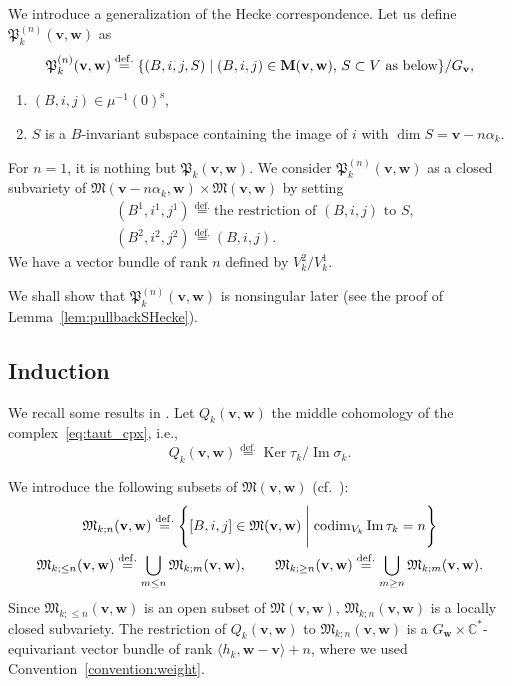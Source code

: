 \documentclass[12pt]{amsart}
\def\Bbb{\mathbb}
\def\frak{\mathfrak}
\renewcommand{\labelenumi}{(\theenumi)}%
\newenvironment{aenume}{%
  \begin{enumerate}%
  \renewcommand{\theenumi}{\alph{enumi}}%
  \renewcommand{\labelenumi}{(\theenumi)}%
  }{\end{enumerate}}
\theoremstyle{definition}
\theoremstyle{remark}
\numberwithin{equation}{subsection}
\newcommand{\lemref}[1]{Lemma~\ref{#1}}
\newcommand{\defeq}{\overset{\operatorname{\scriptstyle def.}}{=}}
\newcommand{\C}{{\Bbb C}}
\newcommand{\Ker}{\operatorname{Ker}}
\newcommand{\Ima}{\operatorname{Im}}
\newcommand{\vin}{\operatorname{in}} %
\newcommand{\vout}{\operatorname{out}} %
\newcommand{\bM}{{\mathbf M}} %
\newcommand{\M}{{\frak M}} %
\newcommand{\bv}{{\mathbf v}} %
\newcommand{\bw}{{\mathbf w}} %
\newcommand{\codim}{\operatorname{codim}} %
\newcommand{\Pa}{{\frak P}} %
\begin{document}
\subsection{}
We introduce a generalization of the Hecke correspondence.
Let us define $\Pa_k^{(n)}(\bv,\bw)$ as
\begin{equation}
\label{eq:Pa^{(n)}}
   \Pa_k^{(n)}(\bv,\bw) \defeq
   \{ (B,i,j,S)\mid
   \text{$(B,i,j)\in\bM(\bv,\bw)$, $S\subset V$ as below}\}
   /G_\bv,
\end{equation}
\begin{aenume}
\item $(B, i, j)\in\mu^{-1}(0)^{\operatorname{s}}$,
\item $S$ is a $B$-invariant subspace containing the image of $i$ with
         $\dim S = \bv - n\alpha_k$.
\end{aenume}
For $n = 1$, it is nothing but $\Pa_k(\bv,\bw)$. We consider
$\Pa_k^{(n)}(\bv,\bw)$ as a closed subvariety of
$\M(\bv-n\alpha_k,\bw)\times\M(\bv,\bw)$ by setting
\begin{align*}
  & (B^1,i^1,j^1) \defeq \text{the restriction
                               of $(B,i,j)$ to $S$},\\
  & (B^2,i^2,j^2) \defeq (B,i,j).
\end{align*}
We have a vector bundle of rank $n$ defined by $V_k^2/V_k^1$.

We shall show that $\Pa_k^{(n)}(\bv,\bw)$ is nonsingular later (see
the proof of \lemref{lem:pullbackSHecke}).

\subsection{Induction}
We recall some results in \cite[\S4]{Na-alg}. Let $Q_k(\bv,\bw)$ the
middle cohomology of the complex~\eqref{eq:taut_cpx}, i.e.,
\begin{equation*}
    Q_k(\bv,\bw) \defeq 
    \Ker \tau_k / \Ima \sigma_k
.
\end{equation*}

We introduce the following subsets of $\M(\bv,\bw)$
(cf.\ \cite[12.2]{Lu2}):
\begin{equation}\label{taut:subset}
\begin{gathered}
        \M_{k;n}(\bv,\bw) \defeq
        \left\{ [B,i,j]\in \M(\bv,\bw) \Biggm| \codim_{V_k}
        \Ima \tau_k
        = n \right\} \\
        \M_{k;\le n}(\bv,\bw) \defeq
        \bigcup_{m\le n} \M_{k;m}(\bv,\bw), \qquad
        \M_{k;\ge n}(\bv,\bw) \defeq
        \bigcup_{m\ge n} \M_{k;m}(\bv,\bw).
\end{gathered}
\end{equation}
Since $\M_{k;\le n}(\bv,\bw)$ is an open subset of $\M(\bv,\bw)$,
$\M_{k;n}(\bv,\bw)$ is a locally closed subvariety.  The restriction
of $Q_k(\bv,\bw)$ to $\M_{k;n}(\bv,\bw)$ is a
$G_\bw\times\C^*$-equivariant vector bundle of rank 
$\langle h_k, \bw - \bv\rangle + n$,
where we used Convention~\ref{convention:weight}.
\end{document}
